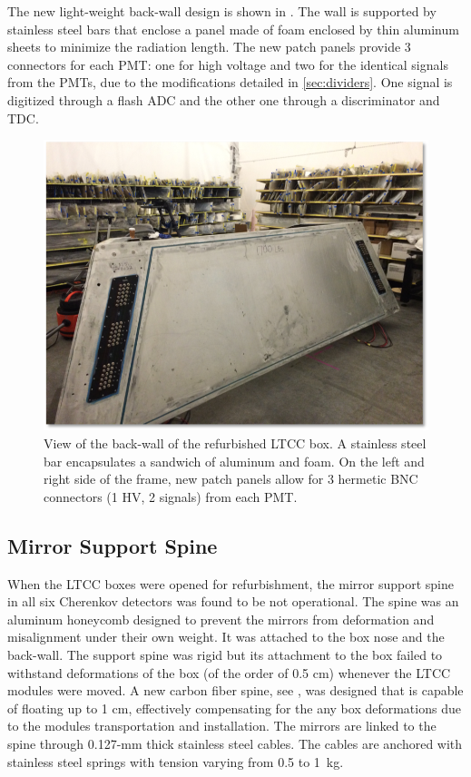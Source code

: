 The new light-weight back-wall design is shown in . The wall is supported by stainless steel bars that enclose a panel
made of foam enclosed by thin aluminum sheets to minimize the radiation length. The new patch panels provide 3
connectors for each PMT: one for high voltage and two for the identical signals from the PMTs, due to the modifications
detailed in \ref{sec:dividers}.
One signal is digitized through a flash ADC and the other one through a discriminator and TDC.

\begin{figure}[h]
	\centering
	\includegraphics[width=0.99\columnwidth,keepaspectratio]{img/backWall.png}
	\caption{View of the back-wall of the refurbished LTCC box. A stainless steel bar encapsulates a sandwich of
          aluminum and foam. On the left and right side of the frame, new patch panels allow for 3 hermetic BNC
          connectors (1 HV, 2 signals) from each PMT.}
	\label{fig:backWall}
\end{figure}

\subsection{Mirror Support Spine}

When the LTCC boxes were opened for refurbishment, the mirror support spine in all six Cherenkov detectors was
found to be not operational. The spine was an aluminum honeycomb designed to prevent the mirrors from deformation
and misalignment under their
own weight. It was attached to the box nose and the back-wall. The support spine was rigid but its attachment
to the box failed to withstand deformations of the box (of the order of 0.5 cm) whenever the LTCC modules were moved.
A new carbon fiber spine, see ,
was designed that is capable of floating up to 1 cm, effectively compensating for the any box deformations due to
the modules transportation and installation.
The mirrors are linked to the spine through 0.127-mm thick stainless steel cables. The cables are anchored with stainless
steel springs with tension varying from 0.5 to 1~kg.

